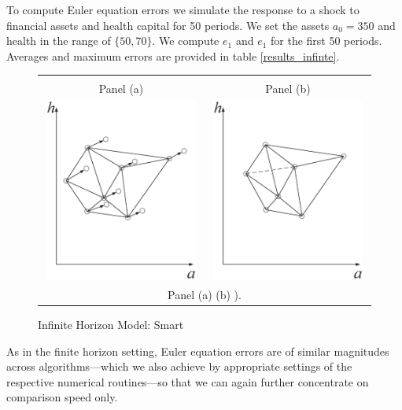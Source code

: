 \documentclass[a4paper,12pt]{article}%
\begin{document}
To compute Euler equation errors we simulate the response to a shock to financial assets and health capital for 50 periods. We set the assets $a_{0}=350$ and health in the range of $\{50,70\}$. We compute $e_{1}$ and $e_{1}$ for the first 50 periods. Averages and maximum errors are provided in table \ref{results_infinte}.

\begin{figure}[htb] \centering
\caption{Infinite Horizon Model: Smart}
\begin{tabular}
[c]{cc}
& \\
Panel (a) & Panel (b)\\
{\includegraphics[height=6.0cm, width=6.0cm]{Abbildungen/Smart_1.eps}} & {\includegraphics[height=6.0cm, width=6.0cm]{Abbildungen/Smart_2.eps}} \\
\multicolumn{2}{p{15cm}}{{\footnotesize Panel (a)  (b) ).}}
\end{tabular}
\label{graph_infinte copy(1)}
\end{figure}

As in the finite horizon setting, Euler equation errors are of similar magnitudes across algorithms---which we also achieve by appropriate settings of the respective numerical routines---so that we can again further concentrate on comparison speed only.
\end{document}
